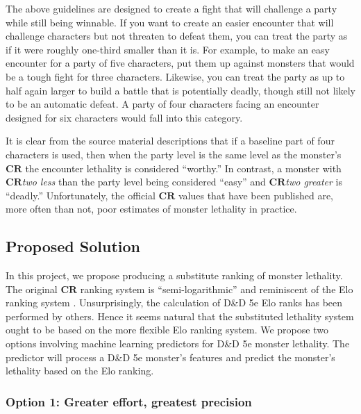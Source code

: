 \documentclass{article}
\newcommand{\CR}{\ensuremath{\mathbf{CR}}\xspace}
\newcommand{\DnD}{D\&D 5e\xspace}
\newcommand{\TierLeast}{\ensuremath{\textsc{Least}}\xspace}
\newcommand{\TierLess}{\ensuremath{\textsc{Less}}\xspace}
\newcommand{\TierFair}{\ensuremath{\textsc{Fair}}\xspace}
\newcommand{\TierMore}{\ensuremath{\textsc{More}}\xspace}
\newcommand{\TierMost}{\ensuremath{\textsc{Most}}\xspace}
\begin{document}
\begin{displayquote}
	The above guidelines are designed to create a fight that will challenge a party while still being winnable.
	If you want to create an easier encounter that will challenge characters but not threaten to defeat them, you can treat the party as if it were roughly one-third smaller than it is.
	For example, to make an easy encounter for a party of five characters, put them up against monsters that would be a tough fight for three characters.
	Likewise, you can treat the party as up to half again larger to build a battle that is potentially deadly, though still not likely to be an automatic defeat.
	A party of four characters facing an encounter designed for six characters would fall into this category.
\end{displayquote}

It is clear from the source material descriptions that if a baseline part of four characters is used, then when the party level is the same level as the monster's \CR the encounter lethality is considered ``worthy.'' In contrast, a monster with \CR \emph{two less} than the party level being considered ``easy'' and \CR \emph{two greater} is ``deadly.''
Unfortunately, the official \CR values that have been published are, more often than not, poor estimates of monster lethality in practice.


\subsection{Proposed Solution}

In this project, we propose producing a substitute ranking of monster lethality.
The original \CR ranking system is ``semi-logarithmic'' and reminiscent of the Elo ranking system \cite{elo1978rating}.
Unsurprisingly, the calculation of \DnD Elo ranks has been performed by others.
Hence it seems natural that the substituted lethality system ought to be based on the more flexible Elo ranking system.
We propose two options involving machine learning predictors for \DnD monster lethality.
The predictor will process a \DnD monster's features and predict the monster's lethality based on the Elo ranking.


\subsubsection{Option 1: Greater effort, greatest precision}
\end{document}
